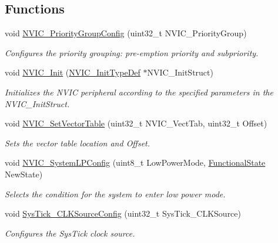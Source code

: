 \subsection*{Functions}
\begin{DoxyCompactItemize}
\item 
void \hyperlink{group___m_i_s_c___exported___functions_gadfb1f34f803ce54c976643db8c484442}{N\+V\+I\+C\+\_\+\+Priority\+Group\+Config} (uint32\+\_\+t N\+V\+I\+C\+\_\+\+Priority\+Group)
\begin{DoxyCompactList}\small\item\em Configures the priority grouping\+: pre-\/emption priority and subpriority. \end{DoxyCompactList}\item 
void \hyperlink{group___m_i_s_c___exported___functions_ga4ab373ed0870c06fca5eb51d639adf41}{N\+V\+I\+C\+\_\+\+Init} (\hyperlink{struct_n_v_i_c___init_type_def}{N\+V\+I\+C\+\_\+\+Init\+Type\+Def} $\ast$N\+V\+I\+C\+\_\+\+Init\+Struct)
\begin{DoxyCompactList}\small\item\em Initializes the N\+V\+IC peripheral according to the specified parameters in the N\+V\+I\+C\+\_\+\+Init\+Struct. \end{DoxyCompactList}\item 
void \hyperlink{group___m_i_s_c___exported___functions_ga1145208ad70edfc2fab19b8b8ef1b1a1}{N\+V\+I\+C\+\_\+\+Set\+Vector\+Table} (uint32\+\_\+t N\+V\+I\+C\+\_\+\+Vect\+Tab, uint32\+\_\+t Offset)
\begin{DoxyCompactList}\small\item\em Sets the vector table location and Offset. \end{DoxyCompactList}\item 
void \hyperlink{group___m_i_s_c___exported___functions_gae21011c5232f5b8f366acbecd12a1d4a}{N\+V\+I\+C\+\_\+\+System\+L\+P\+Config} (uint8\+\_\+t Low\+Power\+Mode, \hyperlink{group___exported__types_gac9a7e9a35d2513ec15c3b537aaa4fba1}{Functional\+State} New\+State)
\begin{DoxyCompactList}\small\item\em Selects the condition for the system to enter low power mode. \end{DoxyCompactList}\item 
void \hyperlink{group___m_i_s_c___exported___functions_ga2777d255bb06ad62bb6372a9db1ff385}{Sys\+Tick\+\_\+\+C\+L\+K\+Source\+Config} (uint32\+\_\+t Sys\+Tick\+\_\+\+C\+L\+K\+Source)
\begin{DoxyCompactList}\small\item\em Configures the Sys\+Tick clock source. \end{DoxyCompactList}\end{DoxyCompactItemize}


